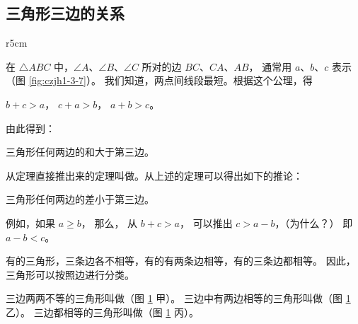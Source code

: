 \subsection{三角形三边的关系}\label{subsec:czjh1-3-2}

\begin{wrapfigure}[8]{r}{5cm}
    \centering
    
    \caption{}\label{fig:czjh1-3-7}
\end{wrapfigure}


在 $\triangle ABC$ 中，$\angle A$、$\angle B$、$\angle C$ 所对的边 $BC$、$CA$、$AB$，
通常用 $a$、$b$、$c$ 表示（图 \ref{fig:czjh1-3-7}）。 我们知道，两点间线段最短。根据这个公理，得

$b + c > a$， $c + a > b$， $a + b > c$。

由此得到：

\begin{dingli}[定理]
    三角形任何两边的和大于第三边。
\end{dingli}

从定理直接推出来的定理叫做。从上述的定理可以得出如下的推论：

\begin{tuilun}[推论]
    三角形任何两边的差小于第三边。
\end{tuilun}

例如，如果 $a \geqslant b$， 那么， 从 $b + c > a$， 可以推出 $c > a - b$，（为什么？） 即 $a - b < c$。

有的三角形，三条边各不相等，有的有两条边相等，有的三条边都相等。
因此，三角形可以按照边进行分类。

三边两两不等的三角形叫做（图 \ref{fig:czjh1-3-8} 甲）。
三边中有两边相等的三角形叫做（图 \ref{fig:czjh1-3-8} 乙）。
三边都相等的三角形叫做（图 \ref{fig:czjh1-3-8} 丙）。

\begin{figure}[htbp]
    \centering
    \begin{minipage}[b]{4.5cm}
        \centering
        
        \caption*{甲}
    \end{minipage}
    \qquad
    \begin{minipage}[b]{4cm}
        \centering
        
        \caption*{乙}
    \end{minipage}
    \begin{minipage}[b]{4cm}
        \centering
        
        \caption*{丙}
    \end{minipage}
    \caption{}\label{fig:czjh1-3-8}
\end{figure}

